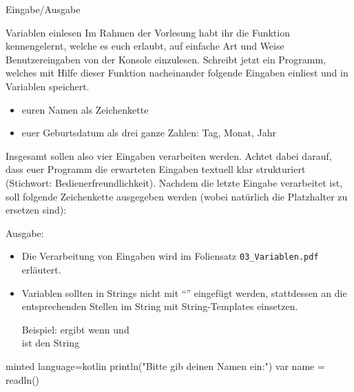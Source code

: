 \begin{task}[points=auto]{Eingabe/Ausgabe }
    \begin{subtask*}[points=0]{Variablen einlesen}
        Im Rahmen der Vorlesung habt ihr die Funktion  kennengelernt, welche es euch erlaubt, auf einfache Art und Weise Benutzereingaben von der Konsole einzulesen. Schreibt jetzt ein Programm, welches mit Hilfe dieser Funktion nacheinander folgende Eingaben einliest und in Variablen speichert.
        \begin{itemize}
            \item euren Namen als Zeichenkette
            \item euer Geburtsdatum als drei ganze Zahlen: Tag, Monat, Jahr
        \end{itemize}
        Insgesamt sollen also vier Eingaben verarbeiten werden. Achtet dabei darauf, dass euer Programm die erwarteten Eingaben textuell klar strukturiert (Stichwort: Bedienerfreundlichkeit).
        Nachdem die letzte Eingabe verarbeitet ist, soll folgende Zeichenkette ausgegeben werden (wobei natürlich die Platzhalter zu ersetzen sind):

        Ausgabe: 

        \begin{hinweise}
            \begin{itemize}
                \item Die Verarbeitung von Eingaben wird im Foliensatz \verb+03_Variablen.pdf+ erläutert.
                \item Variablen sollten in Strings nicht mit \enquote{\kotlininline{+}} eingefügt werden, stattdessen an die entsprechenden Stellen im String mit String-Templates einsetzen.

                    Beispiel:  ergibt wenn  und\\
                     ist den String 
            \end{itemize}
        \end{hinweise}

        \begin{solution}
            \begin{codeBlock}[]{minted language=kotlin}
                println("Bitte gib deinen Namen ein:")
                var name = readln()


\end{codeBlock}
\end{solution}
\end{subtask*}
\end{task}
